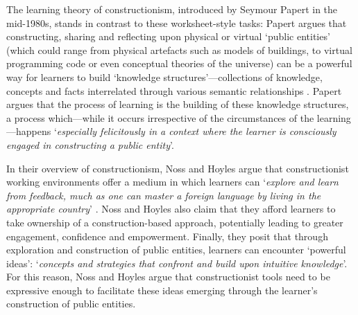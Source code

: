 The learning theory of constructionism, introduced by Seymour Papert in the mid-1980s, stands in contrast to these worksheet-style tasks: Papert argues that constructing, sharing and reflecting upon physical or virtual `public entities' (which could range from physical artefacts such as models of buildings, to virtual programming code or even conceptual theories of the universe) can be a powerful way for learners to build `knowledge structures'---collections of knowledge, concepts and facts interrelated through various semantic relationships \citep{PapertSeymourandHarel1991a}. Papert argues that the process of learning is the building of these knowledge structures, a process which---while it occurs irrespective of the circumstances of the learning---happens `\textit{especially felicitously in a context where the learner is consciously engaged in constructing a public entity}'. 

In their overview of constructionism, Noss and Hoyles argue that constructionist working environments offer a medium in which learners can `\textit{explore and learn from feedback, much as one can master a foreign language by living in the appropriate country}' \citep{Noss2017}. Noss and Hoyles also claim that they afford learners to take ownership of a construction-based approach, potentially leading to greater engagement, confidence and empowerment. Finally, they posit that through exploration and construction of public entities, learners can encounter `powerful ideas': `\textit{concepts and strategies  that confront and build upon intuitive knowledge}'. For this reason, Noss and Hoyles argue that constructionist tools need to be expressive enough to facilitate these ideas emerging through the learner's construction of public entities.


